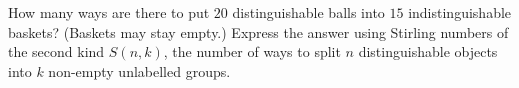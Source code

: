 How many ways are there to put $20$ distinguishable balls into $15$ indistinguishable baskets? (Baskets may stay empty.) Express the answer using Stirling numbers of the second kind $S(n,k)$, the number of ways to split $n$ distinguishable objects into $k$ non-empty unlabelled groups.
